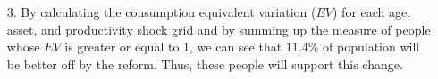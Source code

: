 \documentclass[11pt]{article} %
\begin{document}
\begin{itemize}
		\begin{figure}[h]
			\centering
		\end{figure}

		\begin{figure}[h]
			\centering
		\end{figure}
	
	~\\
	\item[3.] By calculating the consumption equivalent variation ($EV$) for each age, asset, and productivity shock grid and by summing up the measure of people whose $EV$ is greater or equal to $1$, we can see that $11.4\%$ of population will be better off by the reform. Thus, these people will support this change.
	

\end{itemize}
\end{document}
